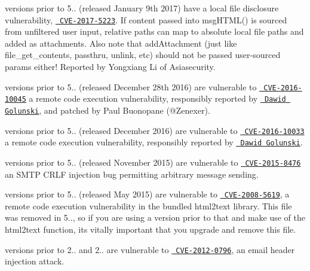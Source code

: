  versions prior to 5.. (released January 9th 2017) have a local file disclosure vulnerability, \href{https://web.nvd.nist.gov/view/vuln/detail?vulnId=CVE-2017-5223}{\texttt{ CVE-\/2017-\/5223}}. If content passed into {\ttfamily msg\+HTML()} is sourced from unfiltered user input, relative paths can map to absolute local file paths and added as attachments. Also note that {\ttfamily add\+Attachment} (just like {\ttfamily file\+\_\+get\+\_\+contents}, {\ttfamily passthru}, {\ttfamily unlink}, etc) should not be passed user-\/sourced params either! Reported by Yongxiang Li of Asiasecurity.

 versions prior to 5.. (released December 28th 2016) are vulnerable to \href{https://web.nvd.nist.gov/view/vuln/detail?vulnId=CVE-2016-10045}{\texttt{ CVE-\/2016-\/10045}} a remote code execution vulnerability, responsibly reported by \href{https://legalhackers.com/advisories/PHPMailer-Exploit-Remote-Code-Exec-CVE-2016-10045-Vuln-Patch-Bypass.html}{\texttt{ Dawid Golunski}}, and patched by Paul Buonopane (@\+Zenexer).

 versions prior to 5.. (released December 2016) are vulnerable to \href{https://web.nvd.nist.gov/view/vuln/detail?vulnId=CVE-2016-10033}{\texttt{ CVE-\/2016-\/10033}} a remote code execution vulnerability, responsibly reported by \href{http://legalhackers.com/advisories/PHPMailer-Exploit-Remote-Code-Exec-CVE-2016-10033-Vuln.html}{\texttt{ Dawid Golunski}}.

 versions prior to 5.. (released November 2015) are vulnerable to \href{https://web.nvd.nist.gov/view/vuln/detail?vulnId=CVE-2015-8476}{\texttt{ CVE-\/2015-\/8476}} an SMTP CRLF injection bug permitting arbitrary message sending.

 versions prior to 5.. (released May 2015) are vulnerable to \href{https://web.nvd.nist.gov/view/vuln/detail?vulnId=CVE-2008-5619}{\texttt{ CVE-\/2008-\/5619}}, a remote code execution vulnerability in the bundled html2text library. This file was removed in 5.., so if you are using a version prior to that and make use of the html2text function, it\textquotesingle{}s vitally important that you upgrade and remove this file.

 versions prior to 2.. and 2.. are vulnerable to \href{https://web.nvd.nist.gov/view/vuln/detail?vulnId=CVE-2012-0796}{\texttt{ CVE-\/2012-\/0796}}, an email header injection attack.

